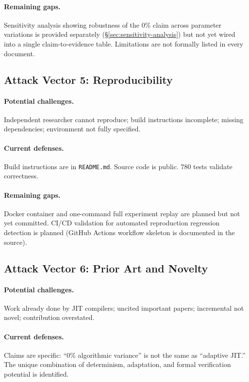 \paragraph{Remaining gaps.}
Sensitivity analysis showing robustness of the 0\% claim across parameter
variations is provided separately (\S\ref{sec:sensitivity-analysis}) but
not yet wired into a single claim-to-evidence table. Limitations are not
formally listed in every document.

\subsection{Attack Vector 5: Reproducibility}

\paragraph{Potential challenges.}
Independent researcher cannot reproduce; build instructions incomplete;
missing dependencies; environment not fully specified.

\paragraph{Current defenses.}
Build instructions are in \texttt{README.md}. Source code is public.
780\raisebox{0.5ex}{+} tests validate correctness.

\paragraph{Remaining gaps.}
Docker container and one-command full experiment replay are planned but not
yet committed. CI/CD validation for automated reproduction regression
detection is planned (GitHub Actions workflow skeleton is documented in the
source).

\subsection{Attack Vector 6: Prior Art and Novelty}

\paragraph{Potential challenges.}
Work already done by JIT compilers; uncited important papers; incremental
not novel; contribution overstated.

\paragraph{Current defenses.}
Claims are specific: ``0\% algorithmic variance'' is not the same as
``adaptive JIT.'' The unique combination of determinism, adaptation, and
formal verification potential is identified.

